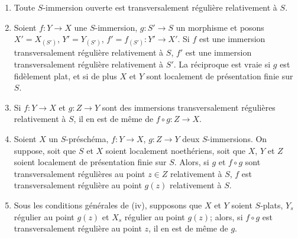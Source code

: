 \begin{proposition}[19.2.7]
\label{IV.19.2.7}
\begin{enumerate}
  \item[\textup{(i)}] Toute $S$-immersion ouverte est transversalement régulière relativement à $S$.
  \item[\textup{(ii)}] Soient $f:Y\to X$ une $S$-immersion, $g:S'\to S$ un morphisme et posons $X'=X_{(S')}$, $Y'=Y_{(S')}$, $f'=f_{(S')}:Y'\to X'$. Si $f$ est une immersion transversalement régulière relativement à $S$, $f'$ est une immersion transversalement régulière relativement à $S'$. La réciproque est vraie si $g$ est fidèlement plat, et si de plus $X$ et $Y$ sont localement de présentation finie sur $S$.
  \item[\textup{(iii)}] Si $f:Y\to X$ et $g:Z\to Y$ sont des immersions transversalement régulières relativement à $S$, il en est de même de $f\circ g:Z\to X$.
  \item[\textup{(iv)}] Soient $X$ un $S$-préschéma, $f:Y\to X$, $g:Z\to Y$ deux $S$-immersions. On suppose, soit que $S$ et $X$ soient localement noethériens, soit que $X$, $Y$ et $Z$ soient localement de présentation finie sur $S$. Alors, si $g$ et $f\circ g$ sont transversalement régulières au point $z\in Z$ relativement à $S$, $f$ est transversalement régulière au point $g(z)$ relativement à $S$.
  \item[\textup{(v)}] Sous les conditions générales de \textup{(iv)}, supposons que $X$ et $Y$ soient $S$-plats, $Y_s$ régulier au point $g(z)$ et $X_s$ régulier au point $g(z)$; alors, si $f\circ g$ est transversalement régulière au point $z$, il en est de même de $g$.
\end{enumerate}
\end{proposition}

